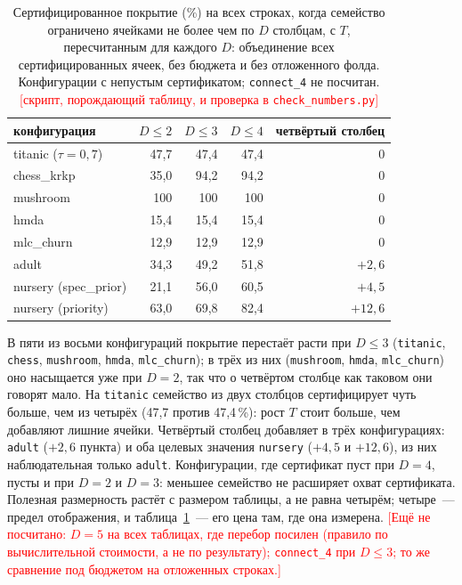 \documentclass[11pt]{article}
\newcommand{\todo}[1]{\textcolor{red}{[#1]}}
\begin{document}
\begin{table}[t]\centering\small
\caption{Сертифицированное покрытие (\%) на всех строках, когда семейство ограничено ячейками не более чем по $D$ столбцам, с $T$, пересчитанным для каждого $D$: объединение всех сертифицированных ячеек, без бюджета и без отложенного фолда. Конфигурации с непустым сертификатом; \texttt{connect\_4} не посчитан. \todo{скрипт, порождающий таблицу, и проверка в \texttt{check\_numbers.py}}}\label{tab:maxd}
\begin{tabular}{lrrrr}
\toprule
конфигурация & $D\le2$ & $D\le3$ & $D\le4$ & четвёртый столбец\\
\midrule
titanic ($\tau=0{,}7$) & 47{,}7 & 47{,}4 & 47{,}4 & 0\\
chess\_krkp & 35{,}0 & 94{,}2 & 94{,}2 & 0\\
mushroom & 100 & 100 & 100 & 0\\
hmda & 15{,}4 & 15{,}4 & 15{,}4 & 0\\
mlc\_churn & 12{,}9 & 12{,}9 & 12{,}9 & 0\\
adult & 34{,}3 & 49{,}2 & 51{,}8 & $+2{,}6$\\
nursery (spec\_prior) & 21{,}1 & 56{,}0 & 60{,}5 & $+4{,}5$\\
nursery (priority) & 63{,}0 & 69{,}8 & 82{,}4 & $+12{,}6$\\
\bottomrule
\end{tabular}
\end{table}

В пяти из восьми конфигураций покрытие перестаёт расти при $D\le3$ (\texttt{titanic}, \texttt{chess}, \texttt{mushroom}, \texttt{hmda}, \texttt{mlc\_churn}); в трёх из них (\texttt{mushroom}, \texttt{hmda}, \texttt{mlc\_churn}) оно насыщается уже при $D=2$, так что о четвёртом столбце как таковом они говорят мало. На \texttt{titanic} семейство из двух столбцов сертифицирует чуть больше, чем из четырёх (47,7 против 47,4\,\%): рост $T$ стоит больше, чем добавляют лишние ячейки. Четвёртый столбец добавляет в трёх конфигурациях: \texttt{adult} ($+2{,}6$ пункта) и оба целевых значения \texttt{nursery} ($+4{,}5$ и $+12{,}6$), из них наблюдательная только \texttt{adult}. Конфигурации, где сертификат пуст при $D=4$, пусты и при $D=2$ и $D=3$: меньшее семейство не расширяет охват сертификата. Полезная размерность растёт с размером таблицы, а не равна четырём; четыре~--- предел отображения, и таблица~\ref{tab:maxd}~--- его цена там, где она измерена. \todo{Ещё не посчитано: $D=5$ на всех таблицах, где перебор посилен (правило по вычислительной стоимости, а не по результату); \texttt{connect\_4} при $D\le3$; то же сравнение под бюджетом на отложенных строках.}
\end{document}
